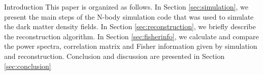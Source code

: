 \begin{section}{Introduction}
  This paper is organized as follows. 
  In Section \ref{sec:simulation}, we present the main steps of the N-body simulation code that was used to simulate the dark matter density fields.
  In Section \ref{sec:reconstruction}, we briefly describe the reconstruction algorithm.
  In Section \ref{sec:fisherinfo}, we calculate and compare the power spectra, correlation matrix and Fisher information given by simulation and reconstruction.
  Conclusion and discussion are presented in Section \ref{sec:conclusion}

\end{section}
